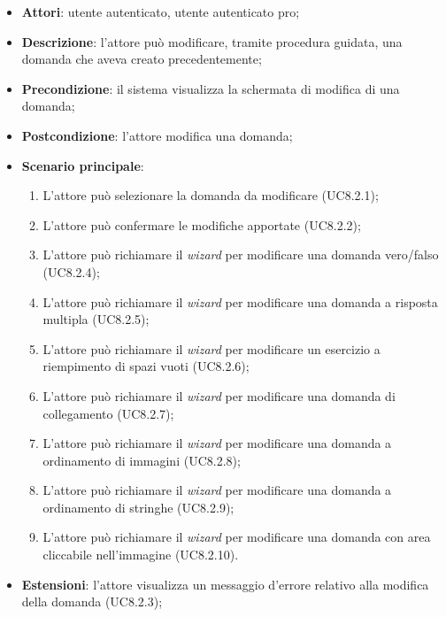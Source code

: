 	\begin{itemize}
		\item
			\textbf{Attori}: utente autenticato, utente autenticato pro;
		\item		
			\textbf{Descrizione}: l'attore può modificare, tramite procedura guidata, una domanda che aveva creato precedentemente;
		\item
			\textbf{Precondizione}: il sistema visualizza la schermata di modifica di una domanda;
		\item
			\textbf{Postcondizione}: l'attore modifica una domanda;
		\item
			\textbf{Scenario principale}: 
			\begin{enumerate}
				\item
				L'attore può selezionare la domanda da modificare (UC8.2.1);
				\item
				L'attore può confermare le modifiche apportate (UC8.2.2);
				\item
				L'attore può richiamare il \textit{wizard} per modificare una domanda vero/falso (UC8.2.4);
				\item
				L'attore può richiamare il \textit{wizard} per modificare una domanda a risposta multipla (UC8.2.5);
				\item
				L'attore può richiamare il \textit{wizard} per modificare un esercizio a riempimento di spazi vuoti (UC8.2.6);
				\item
				L'attore può richiamare il \textit{wizard} per modificare una domanda di collegamento (UC8.2.7);
				\item
				L'attore può richiamare il \textit{wizard} per modificare una domanda a ordinamento di immagini (UC8.2.8);
				\item
				L'attore può richiamare il \textit{wizard} per modificare una domanda a ordinamento di stringhe (UC8.2.9);
				\item
				L'attore può richiamare il \textit{wizard} per modificare una domanda con area cliccabile nell'immagine (UC8.2.10).
			\end{enumerate}
	       		
	 	\item
			\textbf{Estensioni}: l'attore visualizza un messaggio d'errore relativo alla modifica della domanda (UC8.2.3);
	\end{itemize}
	
